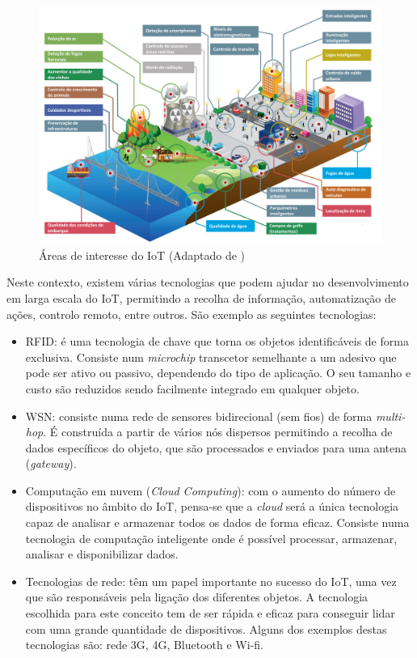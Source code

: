 \begin{figure}[!htb]
	\centering
	\includegraphics[width=\linewidth]{esquemas/adaptacaoiot.pdf}
	\caption[]{Áreas de interesse do \ac{IoT} (Adaptado de \cite{Gubbi2013})}
	\label{libelimaplic}
\end{figure}


Neste contexto, existem várias tecnologias que podem ajudar no desenvolvimento em larga escala do IoT, permitindo a recolha de informação, automatização de ações, controlo remoto, entre outros\cite{Farooq2015}. São exemplo as seguintes tecnologias: 

\begin{itemize}
	\item \ac{RFID}: é uma tecnologia de chave que torna os objetos identificáveis de forma exclusiva. Consiste num \textit{microchip} transcetor semelhante a um adesivo que pode ser ativo ou passivo, dependendo do tipo de aplicação. O seu tamanho e custo são reduzidos sendo facilmente integrado em qualquer objeto. 
	  
	\item \ac{WSN}: consiste numa rede de sensores bidirecional (sem fios) de forma\textit{ multi-hop}. É construída a partir de vários nós dispersos permitindo a recolha de dados específicos do objeto, que são processados e enviados para uma antena (\textit{gateway}). 
	
	\item Computação em nuvem (\textit{Cloud Computing}): com o aumento do número de dispositivos no âmbito do IoT, pensa-se que a \textit{cloud} será a única tecnologia capaz de analisar e armazenar todos os dados de forma eficaz. Consiste numa tecnologia de computação inteligente onde é possível processar, armazenar, analisar e disponibilizar dados.   
	
	\item Tecnologias de rede: têm um papel importante no sucesso do IoT, uma vez que são responsáveis pela ligação dos diferentes objetos. A tecnologia escolhida para este conceito tem de ser rápida e eficaz para conseguir lidar com uma grande quantidade de dispositivos. Alguns dos exemplos destas tecnologias são: rede 3G, 4G, Bluetooth e Wi-fi. 
	
\end{itemize}

